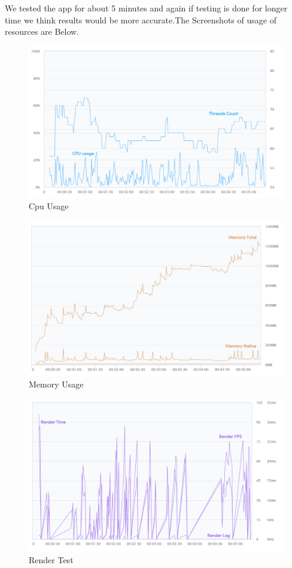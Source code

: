 We tested the app for about 5 minutes and again if testing is done for longer time we think results would be more accurate.The Screenshots of usage of resources are Below.

\begin{figure}[H]
    \centering
    \includegraphics[scale=0.70]{testingshots/CpuUsage.PNG}
    \caption{Cpu Usage}
    \label{fig:Cpu Usage}
\end{figure}

\begin{figure}[H]
    \centering
    \includegraphics[scale=0.60]{testingshots/MemoryUsage.PNG}
    \caption{Memory Usage}
    \label{fig:Memory Usage}
\end{figure}

\begin{figure}[H]
    \centering
    \includegraphics[scale=0.60]{testingshots/RenderTest.PNG}
    \caption{Render Test}
    \label{fig:Render Test}
\end{figure}

